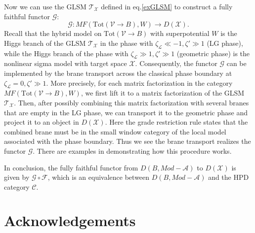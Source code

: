 \documentclass[a4paper,11pt]{article}
\numberwithin{equation}{section}
\begin{document}

Now we can use the GLSM $\mathcal{T}_\mathcal{X}$ defined in eq.\eqref{exGLSM} to construct a fully faithful functor $\mathcal{G}$: \[
\mathcal{G}: MF(\mathrm{Tot}(\mathcal{V}\rightarrow B),W) \rightarrow D(\mathcal{X}).
\]
Recall that the hybrid model on $\mathrm{Tot}(\mathcal{V}\rightarrow B)$ with 
superpotential $W$ is the Higgs branch of the GLSM $\mathcal{T}_\mathcal{X}$ in 
the phase with $\zeta_\mathcal{L} \ll -1, \zeta' \gg 1$ (LG phase), while the 
Higgs branch of the phase with $\zeta_\mathcal{L} \gg 1, \zeta' \gg 1$ 
(geometric phase) is the nonlinear sigma model with target space $\mathcal{X}$. 
Consequently, the functor $\mathcal{G}$ can be implemented by the brane 
transport across the classical phase boundary at $\zeta_\mathcal{L} = 0, 
\zeta' \gg 1$. More precisely, for each matrix factorization in the 
category $MF(\mathrm{Tot}(\mathcal{V}\rightarrow B),W)$, we first lift it to a 
matrix factorization of the GLSM $\mathcal{T}_\mathcal{X}$. Then, after possibly 
combining this matrix factorization with several branes that are empty in the LG 
phase, we can transport it to the geometric phase and project it to an object in 
$D(\mathcal{X})$. Here the grade restriction rule states that the combined brane 
must be in the small window category of the local model associated with the 
phase boundary. Thus we see the brane transport realizes the functor 
$\mathcal{G}$. There are examples in \cite{Chen:2020iyo} demonstrating how this 
procedure works.

In conclusion, the fully faithful functor from $D(B, Mod-\mathcal{A})$ to 
$D(\mathcal{X})$ is given by $\mathcal{G} \circ \mathcal{F}$, which is an 
equivalence between $D(B,Mod-\mathcal{A})$ and the HPD category $\mathcal{C}$.


\section*{Acknowledgements}
\end{document}
